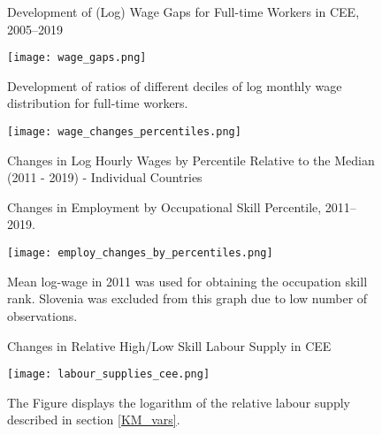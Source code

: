\documentclass[11pt]{article}
\begin{document}





\begin{figure}[!htbp]%
    \centering
    \caption{Development of (Log) Wage Gaps for Full-time Workers in CEE, 2005–2019}
    {\texttt{[image: wage\_gaps.png]} }
    \label{wage_gaps_CEE}
    \caption*{\footnotesize Development of ratios of different deciles of log monthly wage distribution for full-time workers. }
\end{figure}

\begin{figure}[!htbp]%
    \centering
    \caption{Changes in Log Hourly Wages by Percentile Relative to the Median (2011 - 2019) - Individual Countries}
    {\texttt{[image: wage\_changes\_percentiles.png]} }
    \label{wage_changes_percentiles}
\end{figure}

\begin{figure}[!htbp]%
    \centering
    \caption{Changes in Employment by Occupational Skill Percentile, 2011–2019.}
    {\texttt{[image: employ\_changes\_by\_percentiles.png]}
    }
    \label{employ_changes_percentiles}
    \caption*{\footnotesize Mean log-wage in 2011 was used for obtaining the occupation skill rank. Slovenia was excluded from this graph due to low number of observations. }
\end{figure}

\begin{figure}[!htbp]%
        \centering
        \caption{Changes in Relative High/Low Skill Labour Supply in CEE}
        {\texttt{[image: labour\_supplies\_cee.png]}}
        \label{labour_supplies_cee}
        \caption*{\footnotesize The Figure displays the logarithm of the relative labour supply described in section \ref{KM_vars}.}
\end{figure}
\end{document}
